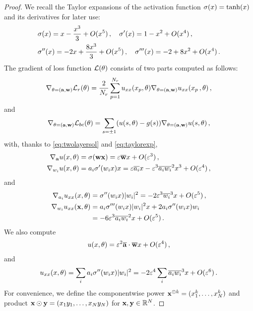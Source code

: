 \begin{proof}
    We recall the Taylor expansions of the activation function $\sigma(x) = \tanh(x)$ and its derivatives for later use:
\begin{equation} \label{eq:taylorexp}
    \begin{aligned}
         &\sigma(x) = x - \frac{x^3}{3} + O(x^5)\,, \quad \sigma'(x) = 1 - x^2 + O(x^4)\,, \\ & \sigma''(x) = - 2 x + \frac{8 x^3}{3} + O(x^5)\,, \quad \sigma'''(x) = -2 + 8 x^2 + O(x^4)\,.
    \end{aligned}
\end{equation}
The gradient of loss function $\mathcal{L}(\theta)$ consists of two parts computed as follows:
\begin{equation*}
    \nabla_{\theta = (\mathbf{a}, \mathbf{w})} \mathcal{L}_r(\theta) = \frac{2}{N_r} \sum_{p = 1}^{N_r} u_{xx}(x_p, \theta) \nabla_{\theta = (\mathbf{a}, \mathbf{w})} u_{xx}(x_p\,, \theta)\,,
\end{equation*}
and 
\begin{equation*}
    \nabla_{\theta = (\mathbf{a}, \mathbf{w})} \mathcal{L}_{bc}(\theta) = \sum_{s = \pm 1} (u(s, \theta) - g(s)) \nabla_{\theta = (\mathbf{a}, \mathbf{w})} u(s, \theta)\,,
\end{equation*}
with, thanks to \eqref{eq:twolayersol} and \eqref{eq:taylorexp}, 
\begin{align*}
     \nabla_{\mathbf{a}}u(x,\theta) &= \sigma(\mathbf{w} \mathbf{x}) = \varepsilon \overline{\mathbf{w}} x + O(\varepsilon^3)\,,\\
     \nabla_{w_i} u(x,\theta) &= a_i \sigma'(w_i x) x = \varepsilon \overline{a_i} x - \varepsilon^3 \overline{a_i} \overline{w_i}^2 x^3 + O(\varepsilon^4)\,,
\end{align*}
and 
\begin{align*}
     \nabla_{a_i} u_{xx}(x, \theta) &= \sigma''(w_i x) |w_i|^2 = - 2 \varepsilon^3 \overline{w_i}^3 x + O(\varepsilon^5)\,, \\ 
     \nabla_{w_i} u_{xx}(\mathbf{x}, \theta) & = a_i \sigma'''(w_i x) |w_i|^2 x + 2 a_i \sigma''(w_i x) w_i \\
     & = - 6 \varepsilon^3 \overline{a_i} \overline{w_i}^2 x + O(\varepsilon^5) \,.
\end{align*}
We also compute 
\begin{align*}
    u(x,\theta) = \varepsilon^2 \overline{\mathbf{a}} \cdot \overline{\mathbf{w}} x + O(\varepsilon^4)\,,
\end{align*}
and 
\begin{equation*}
    u_{xx}(x, \theta) = \sum_i a_i \sigma''(w_i x) |w_i|^2 = - 2 \varepsilon^4\sum_i \overline{a_i} \overline{w_i}^3 x + O(\varepsilon^6)\,.
\end{equation*}
For convenience, we define the componentwise power $\mathbf{x}^{\odot k} = (x_1^k,\ldots, x_N^k)$ and product $ \mathbf{x} \odot \mathbf{y} = (x_1y_1, \ldots, x_N y_N)$ for $\mathbf{x}, \mathbf{y} \in \mathbb{R}^N$.

\end{proof}
